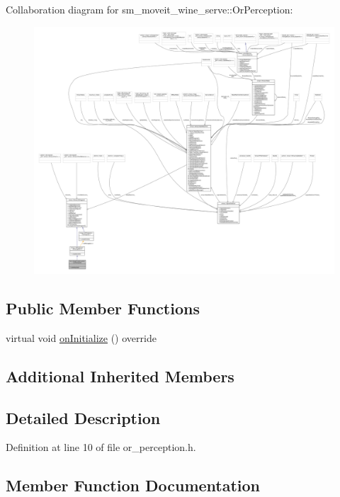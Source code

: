 Collaboration diagram for sm\+\_\+moveit\+\_\+wine\+\_\+serve\+:\+:Or\+Perception\+:
\nopagebreak
\begin{figure}[H]
\begin{center}
\leavevmode
\includegraphics[width=350pt]{classsm__moveit__wine__serve_1_1OrPerception__coll__graph}
\end{center}
\end{figure}
\subsection*{Public Member Functions}
\begin{DoxyCompactItemize}
\item 
virtual void \hyperlink{classsm__moveit__wine__serve_1_1OrPerception_a8883f7aedfc4b53df85a9c7c3d3d1654}{on\+Initialize} () override
\end{DoxyCompactItemize}
\subsection*{Additional Inherited Members}


\subsection{Detailed Description}


Definition at line 10 of file or\+\_\+perception.\+h.



\subsection{Member Function Documentation}
\mbox{\label{classsm__moveit__wine__serve_1_1OrPerception_a8883f7aedfc4b53df85a9c7c3d3d1654}} 
